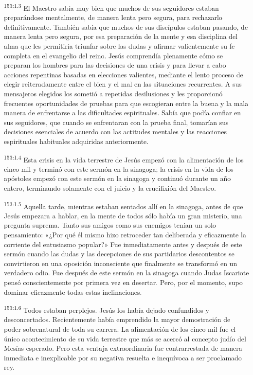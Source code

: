 \par
\textsuperscript{153:1.3} El Maestro sabía muy bien que muchos de sus seguidores estaban preparándose mentalmente, de manera lenta pero segura, para rechazarlo definitivamente. También sabía que muchos de sus discípulos estaban pasando, de manera lenta pero segura, por esa preparación de la mente y esa disciplina del alma que les permitiría triunfar sobre las dudas y afirmar valientemente su fe completa en el evangelio del reino. Jesús comprendía plenamente cómo se preparan los hombres para las decisiones de una crisis y para llevar a cabo acciones repentinas basadas en elecciones valientes, mediante el lento proceso de elegir reiteradamente entre el bien y el mal en las situaciones recurrentes. A sus mensajeros elegidos los sometió a repetidas desilusiones y les proporcionó frecuentes oportunidades de pruebas para que escogieran entre la buena y la mala manera de enfrentarse a las dificultades espirituales. Sabía que podía confiar en sus seguidores, que cuando se enfrentaran con la prueba final, tomarían sus decisiones esenciales de acuerdo con las actitudes mentales y las reacciones espirituales habituales adquiridas anteriormente.

\par
\textsuperscript{153:1.4} Esta crisis en la vida terrestre de Jesús empezó con la alimentación de los cinco mil y terminó con este sermón en la sinagoga; la crisis en la vida de los apóstoles empezó con este sermón en la sinagoga y continuó durante un año entero, terminando solamente con el juicio y la crucifixión del Maestro.

\par
\textsuperscript{153:1.5} Aquella tarde, mientras estaban sentados allí en la sinagoga, antes de que Jesús empezara a hablar, en la mente de todos sólo había un gran misterio, una pregunta suprema. Tanto sus amigos como sus enemigos tenían un solo pensamiento: «¿Por qué él mismo hizo retroceder tan deliberada y eficazmente la corriente del entusiasmo popular?» Fue inmediatamente antes y después de este sermón cuando las dudas y las decepciones de sus partidarios descontentos se convirtieron en una oposición inconsciente que finalmente se transformó en un verdadero odio. Fue después de este sermón en la sinagoga cuando Judas Iscariote pensó conscientemente por primera vez en desertar. Pero, por el momento, supo dominar eficazmente todas estas inclinaciones.

\par
\textsuperscript{153:1.6} Todos estaban perplejos. Jesús los había dejado confundidos y desconcertados. Recientemente había emprendido la mayor demostración de poder sobrenatural de toda su carrera. La alimentación de los cinco mil fue el único acontecimiento de su vida terrestre que más se acercó al concepto judío del Mesías esperado. Pero esta ventaja extraordinaria fue contrarrestada de manera inmediata e inexplicable por su negativa resuelta e inequívoca a ser proclamado rey.

